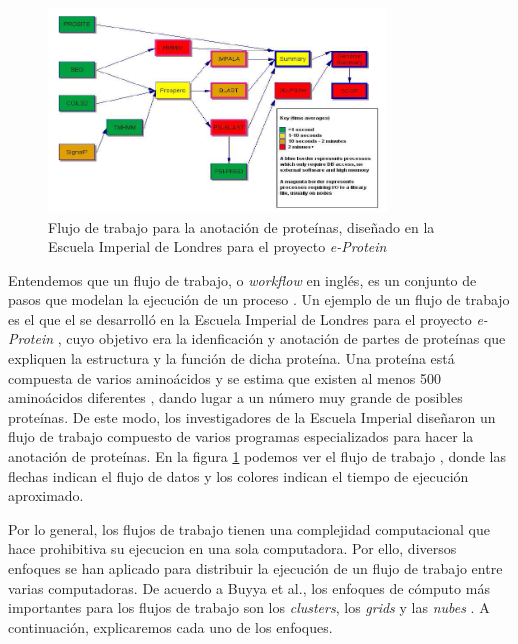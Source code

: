 \documentclass[letterpaper]{report}
\begin{document}
\begin{figure}
    \begin{center}
        \includegraphics[width=0.8\textwidth]{imagenes/iceni-workflow}
    \end{center}
    \caption{Flujo de trabajo para la anotación de proteínas, diseñado en la Escuela Imperial de Londres para el proyecto \emph{e-Protein}}
    \label{fig:iceni-workflow}
\end{figure}

Entendemos que un flujo de trabajo, o \emph{workflow} en inglés, es un conjunto de pasos que modelan la ejecución de un proceso \cite{gutierrez2012agent}. Un ejemplo de un flujo de trabajo es el que el se desarrolló en la Escuela Imperial de Londres para el proyecto \emph{e-Protein} \cite{o2004mapping}, cuyo objetivo era la idenficación y anotación de partes de proteínas que expliquen la estructura y la función de dicha proteína. Una proteína está compuesta de varios aminoácidos y se estima que existen al menos 500 aminoácidos diferentes \cite{wagner1983new}, dando lugar a un número muy grande de posibles proteínas. De este modo, los investigadores de la Escuela Imperial diseñaron un flujo de trabajo compuesto de varios programas especializados para hacer la anotación de proteínas. En la figura \ref{fig:iceni-workflow} podemos ver el flujo de trabajo \cite{o2004mapping}, donde las flechas indican el flujo de datos y los colores indican el tiempo de ejecución aproximado.

Por lo general, los flujos de trabajo tienen una complejidad computacional que hace prohibitiva su ejecucion en una sola computadora. Por ello, diversos enfoques se han aplicado para distribuir la ejecución de un flujo de trabajo entre varias computadoras.  De acuerdo a Buyya et al., los enfoques de cómputo más importantes para los flujos de trabajo son los \emph{clusters}, los \emph{grids} y las \emph{nubes} \cite{buyya2009cloud}. A continuación, explicaremos cada uno de los enfoques.
\end{document}
